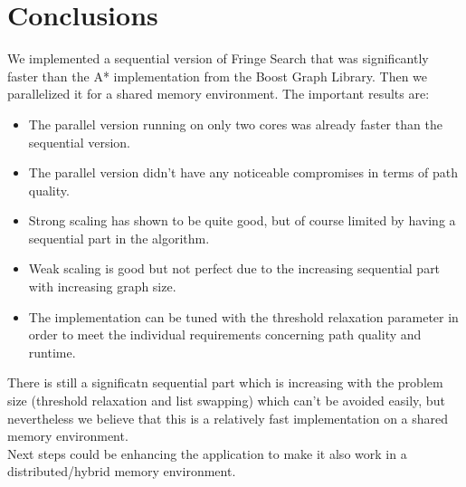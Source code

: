 \documentclass[letterpaper]{article}
\begin{document}
\section{Conclusions}

We implemented a sequential version of Fringe Search that was significantly faster than the A* implementation from the Boost Graph Library. Then we parallelized it for a shared memory environment. The important results are:
\begin{itemize}
\item The parallel version running on only two cores was already faster than the sequential version.
\item The parallel version didn't have any noticeable compromises in terms of path quality.
\item Strong scaling has shown to be quite good, but of course limited by having a sequential part in the algorithm.
\item Weak scaling is good but not perfect due to the increasing sequential part with increasing graph size.
\item The implementation can be tuned with the threshold relaxation parameter in order to meet the individual requirements concerning path quality and runtime.
\end{itemize}
There is still a significatn sequential part which is increasing with the problem size (threshold relaxation and list swapping) which can't be avoided easily, but nevertheless we believe that this is a relatively fast implementation on a shared memory environment.\\
Next steps could be enhancing the application to make it also work in a distributed/hybrid memory environment.





\end{document}
